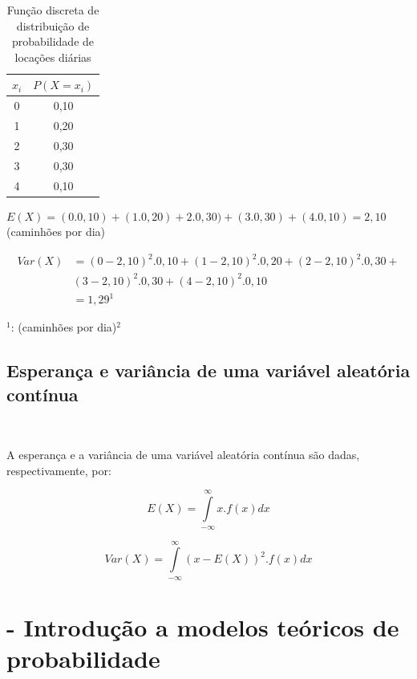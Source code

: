 \documentclass[
]{book}
\begin{document}
\hfill\break

\begin{table}[htbp]
\centering
\caption*{Função discreta de distribuição de probabilidade de locações diárias}
\begin{tabular}{|c|c|}
\hline
$x_{i}$  & $P(X=x_{i})$  \\
\hline
0 & 0,10 \\
\hline
1 & 0,20 \\
\hline
2 & 0,30 \\
\hline
3 & 0,30 \\
\hline
4 & 0,10 \\
\hline
\end{tabular}
\end{table}

\hfill\break

\(E(X) = (0 . 0,10) + (1 . 0,20) + 2 . 0,30) + (3 . 0,30) + (4 . 0,10) = 2,10\) (caminhões por dia)

\hfill\break

\begin{align*}
Var(X) & = (0-2,10)^{2}.0,10 + (1-2,10)^{2}.0,20 + (2-2,10)^{2}.0,30 + \\
       & (3-2,10)^{2}.0,30 + (4-2,10)^{2}.0,10 \\
       & = 1,29^{1}
\end{align*}

\(^{1}\): (caminhões por dia)\(^{2}\)

\hypertarget{esperanuxe7a-e-variuxe2ncia-de-uma-variuxe1vel-aleatuxf3ria-contuxednua}{%
\section{Esperança e variância de uma variável aleatória contínua}\label{esperanuxe7a-e-variuxe2ncia-de-uma-variuxe1vel-aleatuxf3ria-contuxednua}}

~

A esperança e a variância de uma variável aleatória contínua são dadas, respectivamente, por:

\hfill\break

\[
E(X) = \underset{-\infty }{\overset{\infty }{\int }}x.f\left(x\right)dx
\]

\hfill\break

\[
Var(X) = \underset{-\infty }{\overset{\infty }{\int }} (x-E(X))^{2}.f\left(x\right)dx
\]

\hypertarget{modelos_probabilidade}{%
\chapter{- Introdução a modelos teóricos de probabilidade}\label{modelos_probabilidade}}
\end{document}
